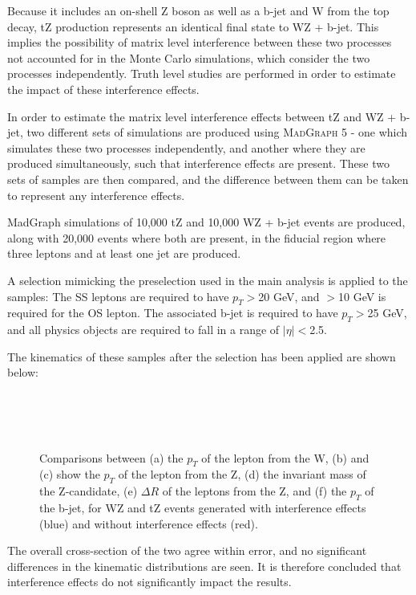 
Because it includes an on-shell Z boson as well as a b-jet and W from the top decay, tZ production represents an identical final state  to WZ + b-jet. This implies the possibility of matrix level interference between these two processes not accounted for in the Monte Carlo simulations, which consider the two processes independently. Truth level studies are performed in order to estimate the impact of these interference effects.    

In order to estimate the matrix level interference effects between tZ and WZ + b-jet, two different sets of simulations are produced using \textsc{MadGraph} 5 \cite{Madgraph} - one which simulates these two processes independently, and another where they are  produced simultaneously, such that interference effects are present. These two sets of samples are then compared, and the difference between them can be taken to represent any interference effects.

MadGraph simulations of 10,000 tZ and 10,000 WZ + b-jet events are produced, along with 20,000 events where both are present, in the fiducial region where three leptons and at least one jet are produced.  

A selection mimicking the preselection used in the main analysis is applied to the samples: The SS leptons are required to have $p_T>$20 GeV, and $>$10 GeV is required for the OS lepton. The associated b-jet is required to have $p_T>$25 GeV, and all physics objects are required to fall in a range of $|\eta|<$2.5. 

The kinematics of these samples after the selection has been applied are shown below:

\begin{figure}[H]
    \\
    \\
    \\
    \caption{Comparisons between (a) the $p_T$ of the lepton from the W, (b) and (c) show the $p_T$ of the lepton from the Z, (d)  the invariant mass of the Z-candidate, (e) $\Delta R$ of the leptons from the Z, and (f) the $p_T$ of the b-jet, for WZ and tZ events generated with interference effects (blue) and without interference effects (red).}
\end{figure}

The overall cross-section of the two agree within error, and no significant differences in the kinematic distributions are seen. It is therefore concluded that interference effects do not significantly impact the results.
